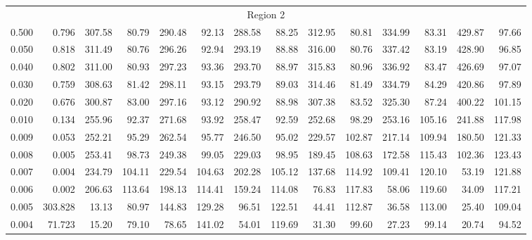 \begin{tabular}{@{}lrrrrrrrrrrrrr@{}}
\midrule
\multicolumn{14}{c}{Region 2} \\
\cmidrule{1-14}
0.500 & 0.796 & 307.58 & 80.79 & 290.48 & 92.13 & 288.58 & 88.25 & 312.95 & 80.81 & 334.99 & 83.31 & 429.87 & 97.66 \\
0.050 & 0.818 & 311.49 & 80.76 & 296.26 & 92.94 & 293.19 & 88.88 & 316.00 & 80.76 & 337.42 & 83.19 & 428.90 & 96.85 \\
0.040 & 0.802 & 311.00 & 80.93 & 297.23 & 93.36 & 293.70 & 88.97 & 315.83 & 80.96 & 336.92 & 83.47 & 426.69 & 97.07 \\
0.030 & 0.759 & 308.63 & 81.42 & 298.11 & 93.15 & 293.79 & 89.03 & 314.46 & 81.49 & 334.79 & 84.29 & 420.86 & 97.89 \\
0.020 & 0.676 & 300.87 & 83.00 & 297.16 & 93.12 & 290.92 & 88.98 & 307.38 & 83.52 & 325.30 & 87.24 & 400.22 & 101.15 \\
0.010 & 0.134 & 255.96 & 92.37 & 271.68 & 93.92 & 258.47 & 92.59 & 252.68 & 98.29 & 253.16 & 105.16 & 241.88 & 117.98 \\
0.009 & 0.053 & 252.21 & 95.29 & 262.54 & 95.77 & 246.50 & 95.02 & 229.57 & 102.87 & 217.14 & 109.94 & 180.50 & 121.33 \\
0.008 & 0.005 & 253.41 & 98.73 & 249.38 & 99.05 & 229.03 & 98.95 & 189.45 & 108.63 & 172.58 & 115.43 & 102.36 & 123.43 \\
0.007 & 0.004 & 234.79 & 104.11 & 229.54 & 104.63 & 202.28 & 105.12 & 137.68 & 114.92 & 109.41 & 120.10 & 53.19 & 121.88 \\
0.006 & 0.002 & 206.63 & 113.64 & 198.13 & 114.41 & 159.24 & 114.08 & 76.83 & 117.83 & 58.06 & 119.60 & 34.09 & 117.21 \\
0.005 & 303.828 & 13.13 & 80.97 & 144.83 & 129.28 & 96.51 & 122.51 & 44.41 & 112.87 & 36.58 & 113.00 & 25.40 & 109.04 \\
0.004 & 71.723 & 15.20 & 79.10 & 78.65 & 141.02 & 54.01 & 119.69 & 31.30 & 99.60 & 27.23 & 99.14 & 20.74 & 94.52 \\


\end{tabular}
